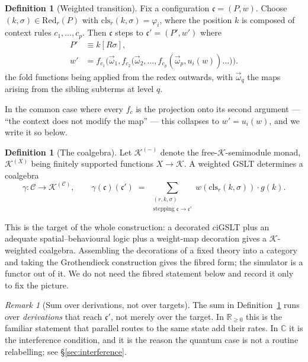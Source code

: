 \documentclass[11pt,a4paper]{article}
\theoremstyle{plain}
\theoremstyle{definition}
\newtheorem{definition}[theorem]{Definition}
\theoremstyle{remark}
\newtheorem{remark}[theorem]{Remark}
\newcommand{\Rnn}{\mathbb{R}_{\geq 0}}
\newcommand{\Cx}{\mathbb{C}}
\newcommand{\Cfg}{\mathcal{C}}
\newcommand{\Red}{\mathrm{Red}}
\newcommand{\wmap}{w}
\newcommand{\gfac}{g}
\newcommand{\class}{\mathrm{cls}}
\begin{document}
\begin{definition}[Weighted transition]
\label{def:transition}
Fix a configuration $\mathfrak{c} = (P, \wmap)$. Choose $(k,\sigma) \in \Red_r(P)$ with
$\class_r(k,\sigma) = \varphi_i$, where the position $k$ is composed of context rules
$c_1, \ldots, c_p$. Then $\mathfrak{c}$ steps to $\mathfrak{c}' = (P', \wmap')$ where
\[
\begin{aligned}
P' &\equiv k[R\sigma],\\
\wmap'
  &= f_{c_1}\!\Big(\vec{\omega}_1,
       f_{c_2}\big(\vec{\omega}_2,\ldots,
       f_{c_p}(\vec{\omega}_p,u_i(\wmap))\ldots\big)\Big).
\end{aligned}
\]
the fold functions being applied from the redex outwards, with $\vec{\omega}_q$ the maps arising
from the sibling subterms at level $q$.
\end{definition}

In the common case where every $f_c$ is the projection onto its second argument --- ``the context
does not modify the map'' --- this collapses to $\wmap' = u_i(\wmap)$, and we write it so below.

\begin{definition}[The coalgebra]
\label{def:coalgebra}
Let $\mathcal{K}^{(-)}$ denote the free-$\mathcal{K}$-semimodule monad, $\mathcal{K}^{(X)}$ being
finitely supported functions $X \to \mathcal{K}$. A weighted GSLT determines a coalgebra
\[
\gamma : \Cfg \longrightarrow \mathcal{K}^{(\Cfg)},
\qquad
\gamma(\mathfrak{c})(\mathfrak{c}') \;=\; \sum_{\substack{(r,k,\sigma) \\ \text{stepping } \mathfrak{c} \to \mathfrak{c}'}} \wmap(\class_r(k,\sigma)) \cdot \gfac(k).
\]
\end{definition}

This is the target of the whole construction: a decorated ciGSLT plus an adequate
spatial--behavioural logic plus a weight-map decoration gives a $\mathcal{K}$-weighted coalgebra.
Assembling the decorations of a fixed theory into a category and taking the Grothendieck
construction gives the fibred form; the simulator is a functor out of it. We do not need the fibred
statement below and record it only to fix the picture.

\begin{remark}[Sum over derivations, not over targets]
The sum in Definition~\ref{def:coalgebra} runs over \emph{derivations} that reach $\mathfrak{c}'$,
not merely over the target. In $\Rnn$ this is the familiar statement that parallel routes to the
same state add their rates. In $\Cx$ it is the interference condition, and it is the reason the
quantum case is not a routine relabelling; see \S\ref{sec:interference}.
\end{remark}
\end{document}
